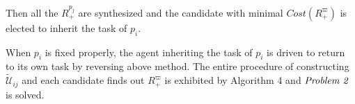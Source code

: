 \documentclass[journal]{IEEEtran}
\begin{document}
Then all the $R^{p_j}_+$ are synthesized and the candidate with minimal $Cost(R^{\varpi}_+)$ is elected to inherit the task of $p_i$.\par
When $p_i$ is fixed properly, the agent inheriting the task of $p_i$ is driven to return to its own task by reversing above method. The entire procedure of constructing $\widetilde{\mathcal{U}}_{ij}$ and each candidate finds out $R^{\varpi}_+$ is exhibited by Algorithm 4 and $\emph{Problem 2}$ is solved.
\end{document}

